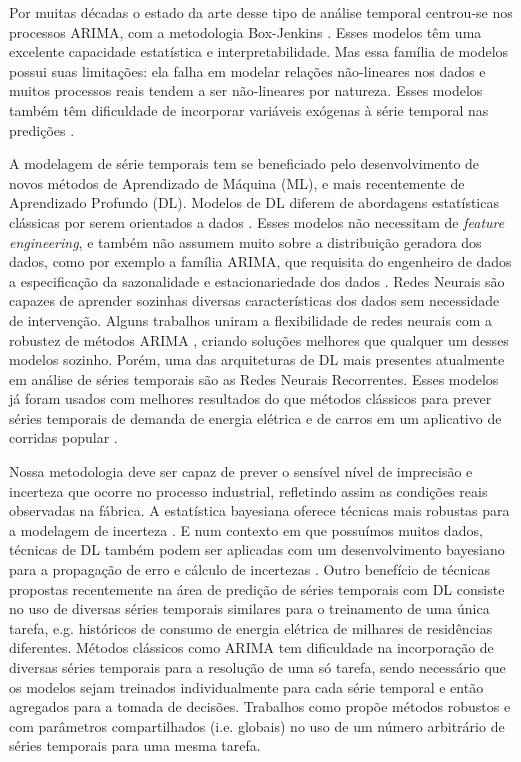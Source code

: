 Por muitas décadas o estado da arte desse tipo de análise temporal centrou-se
nos processos ARIMA, com a metodologia Box-Jenkins \citep{arima}.
Esses modelos têm uma excelente capacidade estatística e interpretabilidade.
Mas essa família de modelos possui suas limitações:
ela falha em modelar relações não-lineares nos dados \citep{forecasting} e 
muitos processos reais tendem a ser não-lineares por natureza.
Esses modelos também têm dificuldade de incorporar variáveis exógenas à série temporal nas predições \citep{ubertime}.


A modelagem de série temporais tem se beneficiado pelo desenvolvimento de novos
métodos de Aprendizado de Máquina (ML), e mais recentemente de Aprendizado Profundo (DL).
Modelos de DL diferem de abordagens estatísticas clássicas por serem orientados
a dados \citep{dlbook}.
Esses modelos não necessitam de \textit{feature engineering}, e também não
assumem muito sobre a distribuição geradora dos dados, como por exemplo a
família ARIMA, que requisita do engenheiro de dados a especificação da
sazonalidade e estacionariedade dos dados \citep{arima}.
Redes Neurais são capazes de aprender sozinhas diversas características dos dados sem necessidade de intervenção. 
Alguns trabalhos uniram a flexibilidade de redes neurais com a robustez de
métodos ARIMA \citep{DIAZROBLES20088331,KHASHEI2010479},
criando soluções melhores que qualquer um desses modelos sozinho. Porém, uma das
arquiteturas de DL mais presentes atualmente em análise de séries temporais
são as Redes Neurais Recorrentes. Esses modelos já foram usados com
melhores resultados do que métodos clássicos para prever séries temporais de
demanda de energia elétrica e de carros em um aplicativo de corridas popular
\citep{energylstm,ubertime}.


Nossa metodologia deve ser capaz de prever o sensível nível de imprecisão e
incerteza que ocorre no processo industrial,
refletindo assim as condições reais observadas na fábrica. A estatística bayesiana oferece técnicas
mais robustas para a modelagem de incerteza \citep{bayesml}. E num contexto em
que possuímos muitos dados, técnicas de DL também podem ser aplicadas com um
desenvolvimento bayesiano para a propagação de erro e cálculo de incertezas
\citep{ubertime,Gal2016Uncertainty}. Outro benefício de técnicas propostas
recentemente na área de predição de séries temporais com DL consiste no uso de diversas séries temporais similares para o treinamento de uma
única tarefa, e.g. históricos de consumo de energia elétrica de milhares
de residências diferentes. Métodos clássicos como ARIMA tem 
dificuldade na incorporação de diversas séries temporais para a resolução de uma
só tarefa, sendo necessário que os modelos sejam treinados individualmente para
cada série temporal e então agregados para a tomada de decisões. Trabalhos como
\citep{ubertime,deepar,deepfactors} propõe métodos robustos e com parâmetros
compartilhados (i.e. globais) no uso de um número arbitrário de séries temporais
para uma mesma tarefa.



